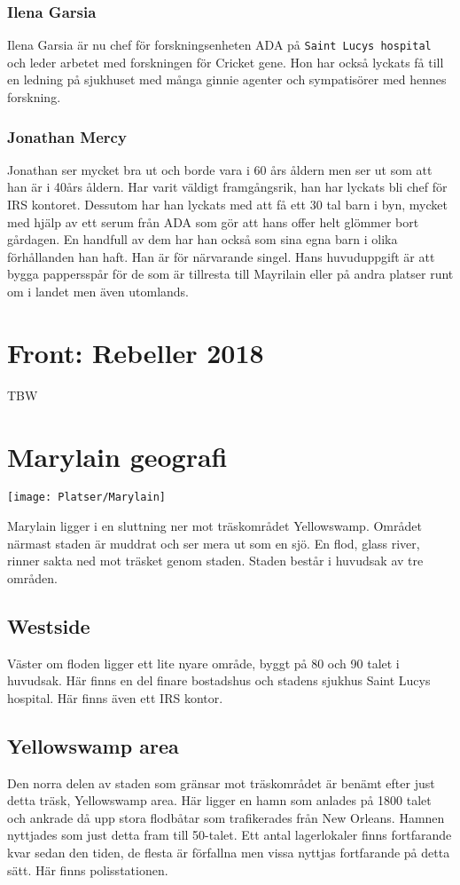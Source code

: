 \documentclass[a5paper,10pt]{report}
\begin{document}
\subsubsection{Ilena Garsia}
Ilena Garsia är nu chef för forskningsenheten ADA på \texttt{Saint Lucys hospital} och leder arbetet med forskningen för Cricket gene. Hon har också lyckats få till en ledning på sjukhuset med många ginnie agenter och sympatisörer med hennes forskning.
\subsubsection{Jonathan Mercy}
Jonathan ser mycket bra ut och borde vara i 60 års åldern men ser ut som att han är i 40års åldern. Har varit väldigt framgångsrik, han har lyckats bli chef för IRS kontoret. Dessutom har han lyckats med att få ett 30 tal barn i byn, mycket med hjälp av ett serum från ADA som gör att hans offer helt glömmer bort gårdagen. En handfull av dem har han också som sina egna barn i olika förhållanden han haft. Han är för närvarande singel. Hans huvuduppgift är att bygga pappersspår för de som är tillresta till Mayrilain eller på andra platser runt om i landet men även utomlands.
\section{Front: Rebeller 2018}
TBW
\section{Marylain geografi}
\texttt{[image: Platser/Marylain]}

Marylain ligger i en sluttning ner mot träskområdet Yellowswamp. Området närmast staden är muddrat och ser mera ut som en sjö. En flod, glass river, rinner sakta ned mot träsket genom staden. Staden består i huvudsak av tre områden.
\subsection{Westside}
Väster om floden ligger ett lite nyare område, byggt på 80 och 90 talet i huvudsak. Här finns en del finare bostadshus och stadens sjukhus Saint Lucys hospital. Här finns även ett IRS kontor.
\subsection{Yellowswamp area}
Den norra delen av staden som gränsar mot träskområdet är benämt efter just detta träsk, Yellowswamp area. Här ligger en hamn som anlades på 1800 talet och ankrade då upp stora flodbåtar som trafikerades från New Orleans. Hamnen nyttjades som just detta fram till 50-talet. Ett antal lagerlokaler finns fortfarande kvar sedan den tiden, de flesta är förfallna men vissa nyttjas fortfarande på detta sätt. Här finns polisstationen.
\end{document}
